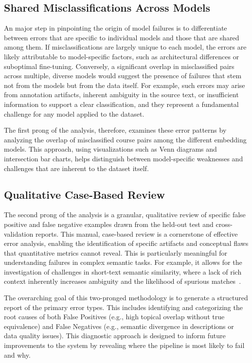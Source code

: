 \subsection{Shared Misclassifications Across Models}\label{ch:3.5.1}
An major step in pinpointing the origin of model failures is to differentiate between errors that are specific to individual models and those that are shared among them. If misclassifications are largely unique to each model, the errors are likely attributable to model-specific factors, such as architectural differences or suboptimal fine-tuning. Conversely, a significant overlap in misclassified pairs across multiple, diverse models would suggest the presence of  failures that stem not from the models but from the data itself. For example, such errors may arise from annotation artifacts, inherent ambiguity in the source text, or insufficient information to support a clear classification, and they represent a fundamental challenge for any model applied to the dataset.

The first prong of the analysis, therefore, examines these error patterns by analyzing the overlap of misclassified course pairs among the different embedding models. This approach, using visualizations such as Venn diagrams and intersection bar charts, helps distinguish between model-specific weaknesses and challenges that are inherent to the dataset itself.

\subsection{Qualitative Case-Based Review}\label{ch:3.5.2}
The second prong of the analysis is a granular, qualitative review of specific false positive and false negative examples drawn from the held-out test and cross-validation reports. This manual, case-based review is a cornerstone of effective error analysis, enabling the identification of specific artifacts and conceptual flaws that quantitative metrics cannot reveal. This is particularly meaningful for understanding failures in complex semantic tasks. For example, it allows for the investigation of challenges in short-text semantic similarity, where a lack of rich context inherently increases ambiguity and the likelihood of spurious matches~\cite{app13063911}.

The overarching goal of this two-pronged methodology is to generate a structured report of the primary error types. This includes identifying and categorizing the root causes of both False Positives (e.g., high topical overlap without true equivalence) and False Negatives (e.g., semantic divergence in descriptions or data quality issues). This diagnostic approach is designed to inform future improvements to the system by revealing where the pipeline is most likely to fail and why.